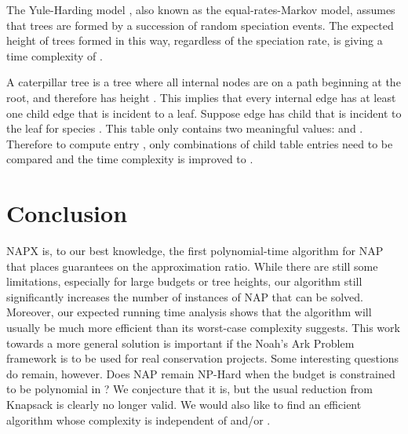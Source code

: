 \documentclass[10pt]{llncs}       \usepackage{graphicx,subfigure}
\begin{document}
The Yule-Harding model \cite{yule25}\cite{harding71}, also known as the 
equal-rates-Markov model, assumes that trees are formed by a succession
of random speciation events.  The expected height of trees formed in this
way, regardless of the speciation rate, is  \cite{erdos99} giving
a time complexity of .

A caterpillar tree is a tree where all internal nodes are on a path beginning
at the root, and therefore has height . This implies 
that every internal edge has at least one child edge that is incident to a 
leaf.  Suppose edge  has child  that is incident to the leaf for 
species .  This 
table only contains two meaningful values:  and .
Therefore to compute entry , only  combinations of child table
entries need to be compared and the time complexity is improved to
.


\section{Conclusion}

NAPX is, to our best knowledge, the first polynomial-time algorithm for 
 NAP that places guarantees on the approximation
ratio. While there are still some limitations, especially for
 large budgets or tree heights, our algorithm still significantly 
increases the
number of instances of NAP that can be solved.  Moreover, our expected
running time analysis shows that the algorithm will usually be much more
efficient than its worst-case complexity suggests.  This
work towards a more general solution is important if the Noah's Ark Problem
 framework
is to be used for real conservation projects.  Some interesting questions do
remain, however.  Does NAP remain NP-Hard when the budget is constrained to
be polynomial in ?  We conjecture that it is, but the usual reduction from
Knapsack is clearly no longer valid. We would also like to find
an efficient algorithm whose complexity is independent of  and/or .    

 

\end{document}
